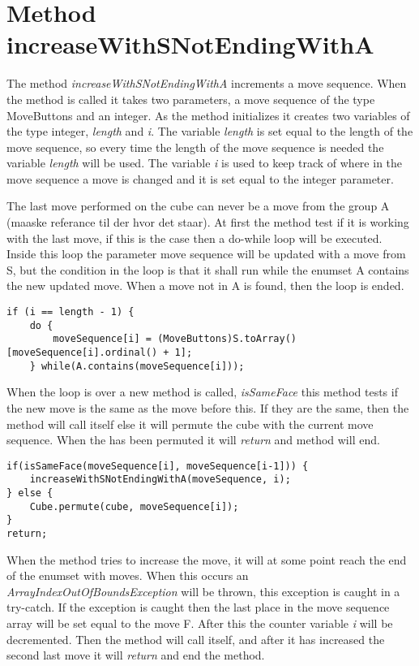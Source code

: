 \section{Method increaseWithSNotEndingWithA}

The method \textit{increaseWithSNotEndingWithA} increments a move sequence.
When the method is called it takes two parameters, a move sequence of the type MoveButtons and an integer.
As the method initializes it creates two variables of the type integer, \textit{length} and \textit{i}.
The variable \textit{length} is set equal to the length of the move sequence, so every time the length of the move sequence is needed the variable \textit{length} will be used.
The variable \textit{i} is used to keep track of where in the move sequence a move is changed and it is set equal to the integer parameter. 

The last move performed on the cube can never be a move from the group A (maaske referance til der hvor det staar).
At first the method test if it is working with the last move, if this is the case then a do-while loop will be executed.
Inside this loop the parameter move sequence will be updated with a move from S, but the condition in the loop is that it shall run while the enumset A contains the new updated move.
When a move not in A is found, then the loop is ended.

\begin{verbatim}
if (i == length - 1) {
	do {
		moveSequence[i] = (MoveButtons)S.toArray()[moveSequence[i].ordinal() + 1];
	} while(A.contains(moveSequence[i]));
\end{verbatim}

When the loop is over a new method is called, \textit{isSameFace} this method tests if the new move is the same as the move before this.
If they are the same, then the method will call itself else it will permute the cube with the current move sequence.
When the \rubik{} has been permuted it will \textit{return} and method will end.

\begin{verbatim}
if(isSameFace(moveSequence[i], moveSequence[i-1])) {
	increaseWithSNotEndingWithA(moveSequence, i);
} else {
	Cube.permute(cube, moveSequence[i]);
}
return;
\end{verbatim}

When the method tries to increase the move, it will at some point reach the end of the enumset with moves.
When this occurs an \textit{ArrayIndexOutOfBoundsException} will be thrown, this exception is caught in a try-catch.
If the exception is caught then the last place in the move sequence array will be set equal to the move F.
After this the counter variable \textit{i} will be decremented.
Then the method will call itself, and after it has increased the second last move it will \textit{return} and end the method.

